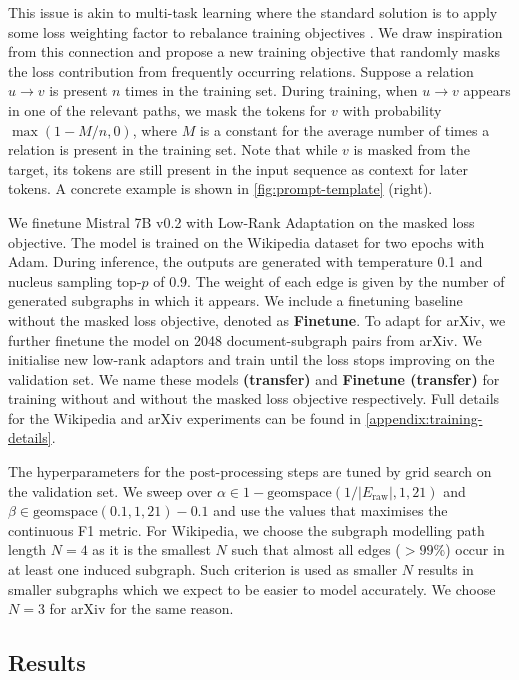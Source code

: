 This issue is akin to multi-task learning \cite{caruana1997multitask} where the standard solution is to apply some loss weighting factor to rebalance training objectives \cite{sermanet2013overfeat,kendall2018multi}. We draw inspiration from this connection and propose a new training objective that randomly masks the loss contribution from frequently occurring relations. Suppose a relation $u \to v$ is present $n$ times in the training set. During training, when $u \to v$ appears in one of the relevant paths, we mask the tokens for $v$ with probability $\max(1 - M/n, 0)$, where $M$ is a constant for the average number of times a relation is present in the training set. Note that while $v$ is masked from the target, its tokens are still present in the input sequence as context for later tokens. A concrete example is shown in \cref{fig:prompt-template} (right).

We finetune Mistral 7B v0.2 \cite{jiang2023mistral} with Low-Rank Adaptation \cite{hu2021lora} on the masked loss objective. The model is trained on the Wikipedia dataset for two epochs with Adam. During inference, the outputs are generated with temperature 0.1 and nucleus sampling \cite{holtzman2019curious} top-$p$ of 0.9. The weight of each edge is given by the number of generated subgraphs in which it appears. We include a finetuning baseline without the masked loss objective, denoted as \textbf{Finetune}. To adapt \name for arXiv, we further finetune the model on 2048 document-subgraph pairs from arXiv. We initialise new low-rank adaptors and train until the loss stops improving on the validation set. We name these models \textbf{\name (transfer)} and \textbf{Finetune (transfer)} for training without and without the masked loss objective respectively. Full details for the Wikipedia and arXiv experiments can be found in \cref{appendix:training-details}.

The hyperparameters for the post-processing steps are tuned by grid search on the validation set. We sweep over $\alpha \in 1 - \text{geomspace}(1 / |E_\text{raw}|, 1, 21)$ and $\beta \in \text{geomspace}(0.1, 1, 21) - 0.1$ and use the values that maximises the continuous F1 metric. For Wikipedia, we choose the subgraph modelling path length $N=4$ as it is the smallest $N$ such that almost all edges ($>99\%$) occur in at least one induced subgraph. Such criterion is used as smaller $N$ results in smaller subgraphs which we expect to be easier to model accurately. We choose $N=3$ for arXiv for the same reason.

\subsection{Results}  \label{sec:results}

